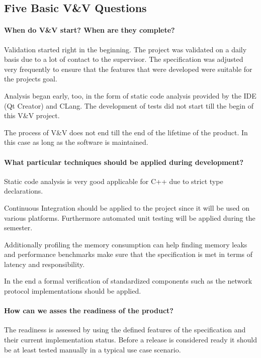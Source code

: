 \documentclass{scrartcl}
\begin{document}
\subsection{Five Basic V\&V Questions}

\paragraph{When do V\&V start?  When are they complete?}

Validation started right in the beginning. The project was validated on a daily basis  due to a lot of contact to the supervisor. The specification was adjusted very frequently to ensure that the features that were developed were suitable for the projects goal.

Analysis began early, too, in the form of static code analysis provided by the IDE (Qt Creator) and CLang. The development of tests did not start till the begin of this V\&V project.

The process of V\&V does not end till the end of the lifetime of the product. In this case as long as the software is maintained.

\paragraph{What particular techniques should be applied during development?}

Static code analysis is very good applicable for C++ due to strict type declarations. 

Continuous Integration should be applied to the project since it will be used on various platforms. Furthermore automated unit testing will be applied during the semester.

Additionally profiling the memory consumption can help finding memory leaks and performance benchmarks make sure that the specification is met in terms of latency and responsibility.

In the end a formal verification of standardized components such as the network protocol implementations should be applied.

\paragraph{How can we asses the readiness of the product?}

The readiness is assessed by using the defined features of the specification and their current implementation status. Before a release is considered ready it should be at least tested manually in a typical use case scenario.
\end{document}
